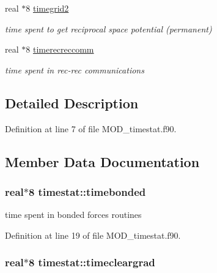 \begin{DoxyCompactItemize}
real $\ast$8 \hyperlink{classtimestat_a3ae3541e8b68065f98087c4f8a03c2bb}{timegrid2}
\begin{DoxyCompactList}\small\item\em time spent to get reciprocal space potential (permanent) \end{DoxyCompactList}\item 
real $\ast$8 \hyperlink{classtimestat_a953a0208aa2c3e69c391ffc813b2cd8d}{timerecreccomm}
\begin{DoxyCompactList}\small\item\em time spent in rec-\/rec communications \end{DoxyCompactList}\end{DoxyCompactItemize}


\subsection{Detailed Description}


Definition at line 7 of file M\-O\-D\-\_\-timestat.\-f90.



\subsection{Member Data Documentation}
\hypertarget{classtimestat_ae8564a39f5d612c7c0680539da171be3}{
\subsubsection[{timebonded}]{\setlength{\rightskip}{0pt plus 5cm}real$\ast$8 timestat\-::timebonded}}\label{classtimestat_ae8564a39f5d612c7c0680539da171be3}


time spent in bonded forces routines 



Definition at line 19 of file M\-O\-D\-\_\-timestat.\-f90.

\hypertarget{classtimestat_aee23bffbb72e8e484b94e38148eb4a99}{
\subsubsection[{timecleargrad}]{\setlength{\rightskip}{0pt plus 5cm}real$\ast$8 timestat\-::timecleargrad}}\label{classtimestat_aee23bffbb72e8e484b94e38148eb4a99}


